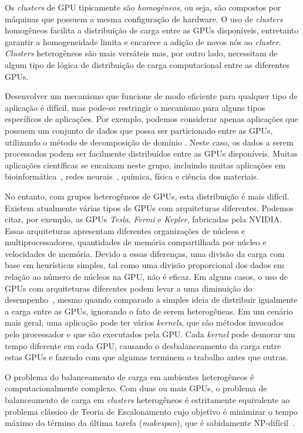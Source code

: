 Os \textit{clusters} de GPU tipicamente são \emph{homogêneos}, ou seja, são
compostos por máquinas que possuem a mesma configuração de hardware. O uso de
\textit{clusters} homogêneos facilita a distribuição de carga entre as GPUs
disponíveis, entretanto garantir a homogeneidade limita e encarece a adição de
novos nós ao \textit{cluster}.  \textit{Clusters} heterogêneos são mais
versáteis mas, por outro lado, necessitam de algum tipo de lógica de
distribuição de carga computacional entre as diferentes GPUs.

Desenvolver um mecanismo que funcione de modo eficiente para qualquer tipo de
aplicação é difícil, mas pode-se restringir o mecanismo para alguns tipos
específicos de aplicações. Por exemplo, podemos considerar apenas aplicações que
possuem um conjunto de dados que possa ser particionado entre as GPUs,
utilizando o método de decomposição de domínio \cite{Gropp:1992uq}. Neste caso,
os dados a serem processados podem ser facilmente distribuídos entre as GPUs
disponíveis.  Muitas aplicações científicas se encaixam neste grupo, incluindo
muitas aplicações em bioinformática~\cite{rozante}, redes neurais~\cite{siang},
química, física e ciência dos materiais.

No entanto, com grupos heterogêneos de GPUs, esta distribuição é mais difícil.
Existem atualmente várias tipos de GPUs com arquiteturas diferentes. Podemos
citar, por exemplo, as GPUs \emph{Tesla}, \emph{Fermi} e \emph{Kepler},
fabricadas pela NVIDIA. Essas arquiteturas apresentam diferentes organizações de
núcleos e multiprocessadores, quantidades de memória compartilhada por núcleo e
velocidades de memória. Devido a essas diferenças, uma divisão da carga com base
em heurísticas simples, tal como uma divisão proporcional dos dados em relação
ao número de núcleos na GPU, não é eficaz.  Em alguns casos, o uso de GPUs com
arquiteturas diferentes podem levar a uma diminuição do
desempenho~\cite{raphael}, mesmo quando comparado a simples ideia de distribuir
igualmente a carga entre as GPUs, ignorando o fato de serem heterogêneas.  Em um
cenário mais geral, uma aplicação pode ter vários \textit{kernels}, que são
métodos invocados pelo processador e que são executados pela GPU. Cada
\textit{kernel} pode demorar um tempo diferente em cada GPU, causando o
desbalanceamento da carga entre estas GPUs e fazendo com que algumas terminem o
trabalho antes que outras.

O problema do balanceamento de carga em ambientes heterogêneos é
computacionalmente complexo. Com duas ou mais GPUs, o problema de
balanceamento de carga em \textit{clusters} heterogêneos é
estritamente equivalente ao problema clássico de Teoria de
Escalonamento cujo objetivo é minimizar o tempo máximo do término da
última tarefa (\textit{makespan}), que é sabidamente
NP-difícil~\cite{GaJo1979}.

